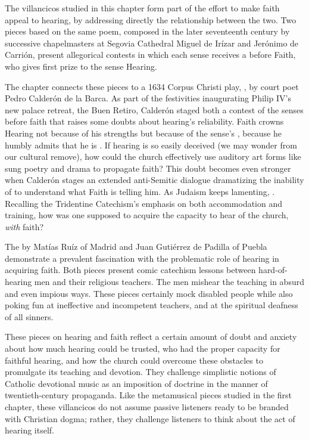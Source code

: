 \documentclass{vcbook-proposal}
\begin{document}
The villancicos studied in this chapter form part of the effort to make faith 
appeal to hearing, by addressing directly the relationship between the two.
Two pieces based on the same poem, composed in the later seventeenth century by 
successive chapelmasters at Segovia Cathedral Miguel de Irízar and Jerónimo de 
Carrión, present allegorical contests in which each sense receives a 
 before Faith, who gives first prize to the sense Hearing.

The chapter connects these pieces to a 1634 Corpus Christi play, , by court poet Pedro Calderón de la Barca.%
  \autocite{Calderon:Retiro}
As part of the festivities inaugurating Philip IV's new palace retreat, the 
Buen Retiro, Calderón staged both a contest of the senses before faith that 
raises some doubts about hearing's reliability.
Faith crowns Hearing not because of his strengths but because of the sense's 
, because he humbly admits that he is .
If hearing is so easily deceived (we may wonder from our cultural remove), how 
could the church effectively use auditory art forms like sung poetry and drama 
to propagate faith?
This doubt becomes even stronger when Calderón stages an extended anti-Semitic 
dialogue dramatizing the inability of  to understand what 
Faith is telling him.
As Judaism keeps lamenting, .
Recalling the Tridentine Catechism's emphasis on both accommodation and 
training, how was one supposed to acquire the capacity to hear  of the church, \emph{with} faith?

The  by Matías Ruíz of Madrid and Juan 
Gutiérrez de Padilla of Puebla demonstrate a prevalent fascination with the 
problematic role of hearing in acquiring faith.
Both pieces present comic catechism lessons between hard-of-hearing men and 
their religious teachers.
The  men mishear the teaching in absurd and even impious ways.
These pieces certainly mock disabled people while also poking fun at 
ineffective and incompetent teachers, and at the spiritual deafness of all 
sinners.

These pieces on hearing and faith reflect a certain amount of doubt and anxiety 
about how much hearing could be trusted, who had the proper capacity for 
faithful hearing, and how the church could overcome these obstacles to 
promulgate its teaching and devotion.
They challenge simplistic notions of Catholic devotional music as an imposition 
of doctrine in the manner of twentieth-century propaganda. 
Like the metamusical pieces studied in the first chapter, these villancicos do 
not assume passive listeners ready to be branded with Christian dogma; rather, 
they challenge listeners to think about the act of hearing itself.
\end{document}
